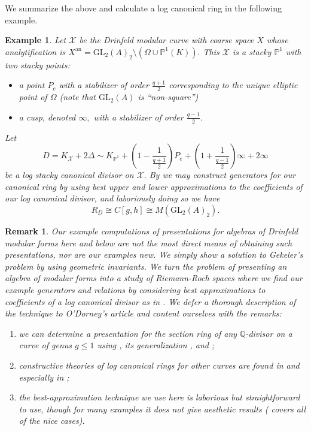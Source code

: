 \documentclass[11pt]{amsart}
\newtheorem{example}[theorem]{Example}
\newtheorem{remark}[theorem]{Remark}
\theoremstyle{definition}
\numberwithin{equation}{section}
\newcommand{\GL}{\mathrm{GL}} 	%
\newcommand{\sX}{\mathscr{X}}		%
\newcommand{\bbP}{\mathbb{P}}		%
\newcommand{\bbQ}{\mathbb{Q}}		%
\begin{document}
We summarize the above and calculate a log canonical ring in the following example.
\begin{example}
Let $\sX$ be the Drinfeld modular curve with coarse space $X$ whose analytification is $X^{\text{an}}=\GL_2(A)_2\setminus(\Omega\cup\bbP^1(K)).$ This $\sX$ is a stacky $\bbP^1$ with two stacky points: 
\begin{itemize}
	\item a point $P_e$ with a stabilizer of order $\displaystyle{\frac{q+1}{2}}$ corresponding to the unique elliptic point of $\Omega$ (note that $\GL_2(A)$ is ``non-square'')
	\item a cusp, denoted $\infty,$ with a stabilizer of order $\displaystyle{\frac{q-1}{2}}.$
\end{itemize} 

Let \[D=K_{\sX}+2\Delta\sim K_{\bbP^1}+\left(1-\frac{1}{\frac{q+1}{2}} \right)P_e + \left(1+\frac{1}{\frac{q-1}{2}}\right)\infty+2\infty\] be a log stacky canonical divisor on $\sX.$ By \cite[Theorem $6$]{ODorney-canonical-rings-Q-divisors-on-P1} we may construct generators for our canonical ring by using best upper and lower approximations to the coefficients of our log canonical divisor, and laboriously doing so we have \[R_D\cong C[g,h]\cong M(\GL_2(A)_2).\]
\end{example}

\begin{remark}\label{r: how we compute canonical rings in our examples}
	Our example computations of presentations for algebras of Drinfeld modular forms here and below are not the most direct means of obtaining such presentations, nor are our examples new. We simply show a solution to Gekeler's problem by using geometric invariants. We turn the problem of presenting an algebra of modular forms into a study of Riemann-Roch spaces where we find our example generators and relations by considering best approximations to coefficients of a log canonical divisor as in \cite{ODorney-canonical-rings-Q-divisors-on-P1}. We defer a thorough description of the technique to O'Dorney's article and content ourselves with the remarks:
	\begin{enumerate}
		\item we can determine a presentation for the section ring of any $\bbQ$-divisor on a curve of genus $g\leq 1$ using \cite{ODorney-canonical-rings-Q-divisors-on-P1}, its generalization \cite{Cerchia-Franklin-ODorney-Qdiv-Ell-curves}, and \cite{VZB};
		\item constructive theories of log canonical rings for other curves are found in \cite{Landesman-Ruhm-Zhang-Spin-canonical-rings} and especially in \cite{VZB};
		\item the best-approximation technique we use here is laborious but straightforward to use, though for many examples it does not give aesthetic results (\cite{VZB} covers all of the nice cases).  
	\end{enumerate}
\end{remark}
\end{document}
